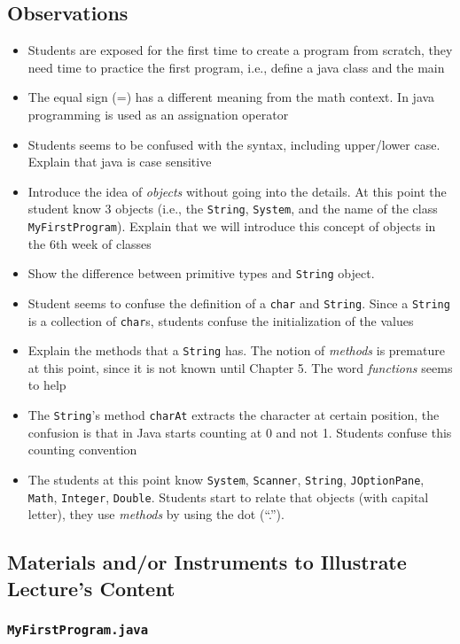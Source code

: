\subsection{Observations}
\begin{itemize}
	\item Students are exposed for the first time to create a program from scratch, they need time to practice 
	the first program, i.e., define a java class and the main
	\item The equal sign (=) has a different meaning from the math context. In java programming is used as an assignation operator
	\item Students seems to be confused with the syntax, including upper/lower case. Explain that java is case sensitive
	\item Introduce the idea of \emph{objects} without going into the details. At this point the student know 3 objects (i.e.,
	the \texttt{String}, \texttt{System}, and the name of the class \texttt{MyFirstProgram}). Explain that we will introduce 
	this concept of objects in the 6th week of classes
	\item Show the difference between primitive types and \texttt{String} object.
	\item Student seems to confuse the definition of a \texttt{char} and \texttt{String}. Since a \texttt{String}
	is a collection of \texttt{char}s, students confuse the initialization of the values
	\item Explain the methods that a \texttt{String} has. The notion of \emph{methods} is premature at this point,
	since it is not known until Chapter 5. The word \emph{functions} seems to help
	\item The \texttt{String}'s method \texttt{charAt} extracts the character at certain position, the confusion 
	is that in Java starts counting at 0 and not 1. Students confuse this counting convention
	\item The students at this point know \texttt{System}, \texttt{Scanner}, \texttt{String}, \texttt{JOptionPane}, 
	\texttt{Math}, \texttt{Integer}, \texttt{Double}. Students start to relate that objects (with capital letter), 
	they use \emph{methods} by using the dot (``.''). 
\end{itemize}
\newpage
\subsection{Materials and/or Instruments to Illustrate Lecture's Content}
	\subsubsection{\texttt{MyFirstProgram.java}}
	

